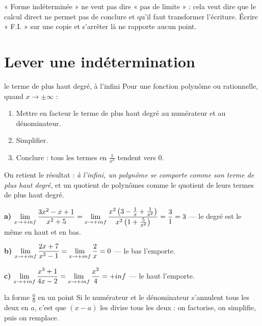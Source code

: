 \begin{avertissement}
« Forme indéterminée » ne veut pas dire « pas de limite » : cela veut dire
que le calcul direct ne permet pas de conclure et qu'il faut transformer
l'écriture. Écrire « F.I. » sur une copie et s'arrêter là ne rapporte aucun
point.
\end{avertissement}

\section{Lever une indétermination}

\begin{methode}{le terme de plus haut degré, à l'infini}
Pour une fonction polynôme ou rationnelle, quand $x \to \pm\infty$ :
\begin{enumerate}[label=\textbf{\arabic*.}, leftmargin=*, itemsep=0.15em]
  \item Mettre en facteur le terme de plus haut degré au numérateur et au
        dénominateur.
  \item Simplifier.
  \item Conclure : tous les termes en $\frac{1}{x^{k}}$ tendent vers $0$.
\end{enumerate}
On retient le résultat : \emph{à l'infini, un polynôme se comporte comme son
terme de plus haut degré}, et un quotient de polynômes comme le quotient de
leurs termes de plus haut degré.
\end{methode}

\begin{exemple}
\textbf{a)} $\limpinf \dfrac{3x^{2}-x+1}{x^{2}+5}
= \limpinf \dfrac{x^{2}\left(3-\frac1x+\frac{1}{x^{2}}\right)}
{x^{2}\left(1+\frac{5}{x^{2}}\right)}
= \dfrac{3}{1} = 3$ — le degré est le même en haut et en bas.

\textbf{b)} $\limpinf \dfrac{2x+7}{x^{2}-1} = \limpinf \dfrac{2}{x} = 0$ —
le bas l'emporte.

\textbf{c)} $\limpinf \dfrac{x^{3}+1}{4x-2} = \limpinf \dfrac{x^{2}}{4}
= +\infty$ — le haut l'emporte.
\end{exemple}

\begin{methode}{la forme $\frac{0}{0}$ en un point}
Si le numérateur et le dénominateur s'annulent tous les deux en $a$, c'est
que $(x-a)$ les divise tous les deux : on factorise, on simplifie, puis on
remplace.
\end{methode}

